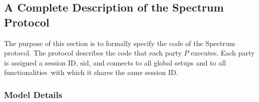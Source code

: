 \subsection{A Complete Description of the Spectrum Protocol}\label{subsec:a-complete-description-of-the-spectrum-protocol}
The purpose of this section is to formally specify the code of the Spectrum protocol.
The protocol describes the code that each party $P$ executes.
Each party is assigned a session ID, $\text{sid}$, and connects to all global setups and to all functionalities\
with which it shares the same session ID\@.

\subsubsection{Model Details}


